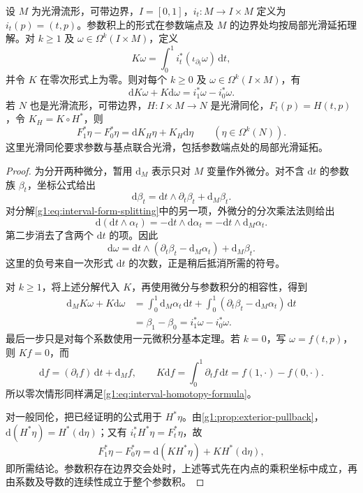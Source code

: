 \begin{theorem}
	\label{g1:thm:homotopy-formula}
	设 \(M\) 为光滑流形，可带边界，\(I=[0,1]\)，\(i_t:M\to I\times M\) 定义为 \(i_t(p)=(t,p)\)。参数积上的形式在参数端点及 \(M\) 的边界处均按局部光滑延拓理解。对 \(k\ge1\) 及 \(\omega\in\Omega^k(I\times M)\)，定义
	\[
		K\omega=\int_0^1i_t^*(\iota_{\partial_t}\omega)\,\mathrm{d}t,
	\]
	并令 \(K\) 在零次形式上为零。则对每个 \(k\ge0\) 及 \(\omega\in\Omega^k(I\times M)\)，有
	\begin{equation}
		\label{g1:eq:interval-homotopy-formula}
		\mathrm{d}K\omega+K\mathrm{d}\omega=i_1^*\omega-i_0^*\omega.
	\end{equation}
	若 \(N\) 也是光滑流形，可带边界，\(H:I\times M\to N\) 是光滑同伦，\(F_t(p)=H(t,p)\)，令 \(K_H=K\circ H^*\)，则
	\begin{equation}
		\label{g1:eq:map-homotopy-formula}
		F_1^*\eta-F_0^*\eta=\mathrm{d}K_H\eta+K_H\mathrm{d}\eta
		\qquad(\eta\in\Omega^k(N)).
	\end{equation}
	这里光滑同伦要求参数与基点联合光滑，包括参数端点处的局部光滑延拓。
\end{theorem}
\begin{proof}
	为分开两种微分，暂用 \(\mathrm{d}_M\) 表示只对 \(M\) 变量作外微分。对不含 \(\mathrm{d}t\) 的参数族 \(\beta_t\)，坐标公式给出
	\[
		\mathrm{d}\beta_t=\mathrm{d}t\wedge\partial_t\beta_t+\mathrm{d}_M\beta_t.
	\]
	对分解\eqref{g1:eq:interval-form-splitting}中的另一项，外微分的分次乘法法则给出
	\[
		\mathrm{d}(\mathrm{d}t\wedge\alpha_t)
		=-\mathrm{d}t\wedge\mathrm{d}\alpha_t
		=-\mathrm{d}t\wedge\mathrm{d}_M\alpha_t.
	\]
	第二步消去了含两个 \(\mathrm{d}t\) 的项。因此
	\begin{equation}
		\label{g1:eq:interval-exterior-derivative}
		\mathrm{d}\omega
		=\mathrm{d}t\wedge(\partial_t\beta_t-\mathrm{d}_M\alpha_t)
		+\mathrm{d}_M\beta_t.
	\end{equation}
	这里的负号来自一次形式 \(\mathrm{d}t\) 的次数，正是稍后抵消所需的符号。

	对 \(k\ge1\)，将上述分解代入 \(K\)，再使用微分与参数积分的相容性，得到
	\[
		\begin{aligned}
			\mathrm{d}_MK\omega+K\mathrm{d}\omega
			&=\int_0^1\mathrm{d}_M\alpha_t\,\mathrm{d}t
			+\int_0^1(\partial_t\beta_t-\mathrm{d}_M\alpha_t)\,\mathrm{d}t\\
			&=\beta_1-\beta_0
			=i_1^*\omega-i_0^*\omega.
		\end{aligned}
	\]
	最后一步只是对每个系数使用一元微积分基本定理。若 \(k=0\)，写 \(\omega=f(t,p)\)，则 \(Kf=0\)，而
	\[
		\mathrm{d}f=(\partial_tf)\,\mathrm{d}t+\mathrm{d}_Mf,\qquad
		K\mathrm{d}f=\int_0^1\partial_tf\,\mathrm{d}t=f(1,\cdot)-f(0,\cdot).
	\]
	所以零次情形同样满足\eqref{g1:eq:interval-homotopy-formula}。

	对一般同伦，把已经证明的公式用于 \(H^*\eta\)。由\cref{g1:prop:exterior-pullback}，\(\mathrm{d}(H^*\eta)=H^*(\mathrm{d}\eta)\)；又有 \(i_t^*H^*\eta=F_t^*\eta\)，故
	\[
		F_1^*\eta-F_0^*\eta
		=\mathrm{d}(KH^*\eta)+KH^*(\mathrm{d}\eta),
	\]
	即所需结论。参数积存在边界交会处时，上述等式先在内点的乘积坐标中成立，再由系数及导数的连续性成立于整个参数积。
\end{proof}

